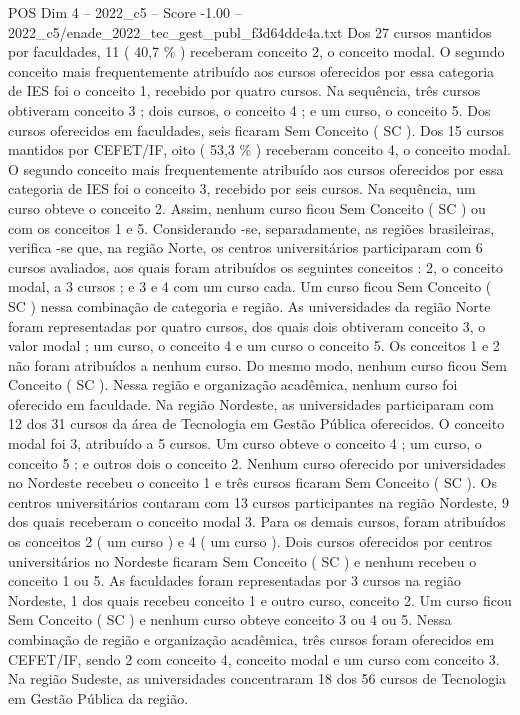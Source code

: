 \begin{textsample}{POS Dim 4 – 2022\_c5 – Score -1.00 – 2022\_c5/enade\_2022\_tec\_gest\_publ\_f3d64ddc4a.txt}
Dos 27 cursos mantidos por faculdades, 11 ( 40,7 \% ) receberam conceito 2, o conceito modal.
O segundo conceito mais frequentemente atribuído aos cursos oferecidos por essa categoria de IES foi o conceito 1, recebido por quatro cursos.
Na sequência, três cursos obtiveram conceito 3 ; dois cursos, o conceito 4 ; e um curso, o conceito 5.
Dos cursos oferecidos em faculdades, seis ficaram Sem Conceito ( SC ).
Dos 15 cursos mantidos por CEFET/IF, oito ( 53,3 \% ) receberam conceito 4, o conceito modal.
O segundo conceito mais frequentemente atribuído aos cursos oferecidos por essa categoria de IES foi o conceito 3, recebido por seis cursos.
Na sequência, um curso obteve o conceito 2.
Assim, nenhum curso ficou Sem Conceito ( SC ) ou com os conceitos 1 e 5.
Considerando -se, separadamente, as regiões brasileiras, verifica -se que, na região Norte, os centros universitários participaram com 6 cursos avaliados, aos quais foram atribuídos os seguintes conceitos : 2, o conceito modal, a 3 cursos ; e 3 e 4 com um curso cada.
Um curso ficou Sem Conceito ( SC ) nessa combinação de categoria e região.
As universidades da região Norte foram representadas por quatro cursos, dos quais dois obtiveram conceito 3, o valor modal ; um curso, o conceito 4 e um curso o conceito 5.
Os conceitos 1 e 2 não foram atribuídos a nenhum curso.
Do mesmo modo, nenhum curso ficou Sem Conceito ( SC ).
Nessa região e organização acadêmica, nenhum curso foi oferecido em faculdade.
Na região Nordeste, as universidades participaram com 12 dos 31 cursos da área de Tecnologia em Gestão Pública oferecidos.
O conceito modal foi 3, atribuído a 5 cursos.
Um curso obteve o conceito 4 ; um curso, o conceito 5 ; e outros dois o conceito 2.
Nenhum curso oferecido por universidades no Nordeste recebeu o conceito 1 e três cursos ficaram Sem Conceito ( SC ).
Os centros universitários contaram com 13 cursos participantes na região Nordeste, 9 dos quais receberam o conceito modal 3.
Para os demais cursos, foram atribuídos os conceitos 2 ( um curso ) e 4 ( um curso ).
Dois cursos oferecidos por centros universitários no Nordeste ficaram Sem Conceito ( SC ) e nenhum recebeu o conceito 1 ou 5.
As faculdades foram representadas por 3 cursos na região Nordeste, 1 dos quais recebeu conceito 1 e outro curso, conceito 2.
Um curso ficou Sem Conceito ( SC ) e nenhum curso obteve conceito 3 ou 4 ou 5.
Nessa combinação de região e organização acadêmica, três cursos foram oferecidos em CEFET/IF, sendo 2 com conceito 4, conceito modal e um curso com conceito 3.
Na região Sudeste, as universidades concentraram 18 dos 56 cursos de Tecnologia em Gestão Pública da região.

\end{textsample}
